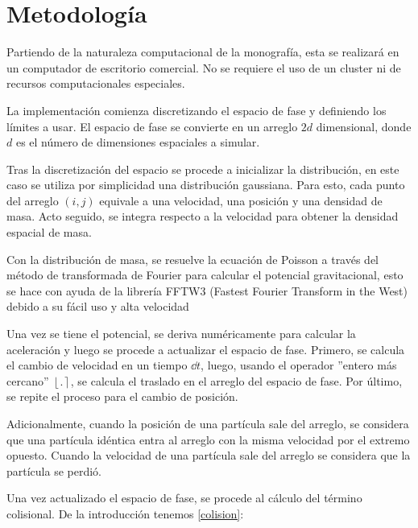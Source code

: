 \documentclass[12pt]{article}
\begin{document}
\section{Metodología}

Partiendo de la naturaleza computacional de la monografía, esta se realizará en un computador de escritorio comercial. No se requiere el uso de un cluster ni de recursos computacionales especiales.


La implementación comienza discretizando el espacio de fase y definiendo los límites a usar. El espacio de fase se convierte en un arreglo $2d$ dimensional, donde $d$ es el número de dimensiones espaciales a simular.

Tras la discretización del espacio se procede a inicializar la distribución, en este caso se utiliza por simplicidad una distribución gaussiana. Para esto, cada punto del arreglo $(i,j)$ equivale a una velocidad, una posición y una densidad de masa. Acto seguido, se integra respecto a la velocidad para obtener la densidad espacial de masa.

Con la distribución de masa, se resuelve la ecuación de Poisson a través del método de transformada de Fourier para calcular el potencial gravitacional, esto se hace con ayuda de la librería FFTW3 (Fastest Fourier Transform in the West) debido a    su fácil uso y alta velocidad\cite{franco}

Una vez se tiene el potencial, se deriva numéricamente para calcular la aceleración y luego se procede a actualizar el espacio de fase. Primero, se calcula el cambio de velocidad en un tiempo $\dd t$, luego, usando el operador ''entero más cercano'' $\left\lfloor{.}\right\rceil$, se calcula el traslado en el arreglo del espacio de fase. Por último, se repite el proceso para el cambio de posición.

Adicionalmente, cuando la posición de una partícula sale del arreglo, se considera que una partícula idéntica entra al arreglo con la misma velocidad por el extremo opuesto. Cuando la velocidad de una partícula sale del arreglo se considera que la partícula se perdió.

Una vez actualizado el espacio de fase, se procede al cálculo del término colisional. De la introducción tenemos \ref{colision}:
\end{document}
